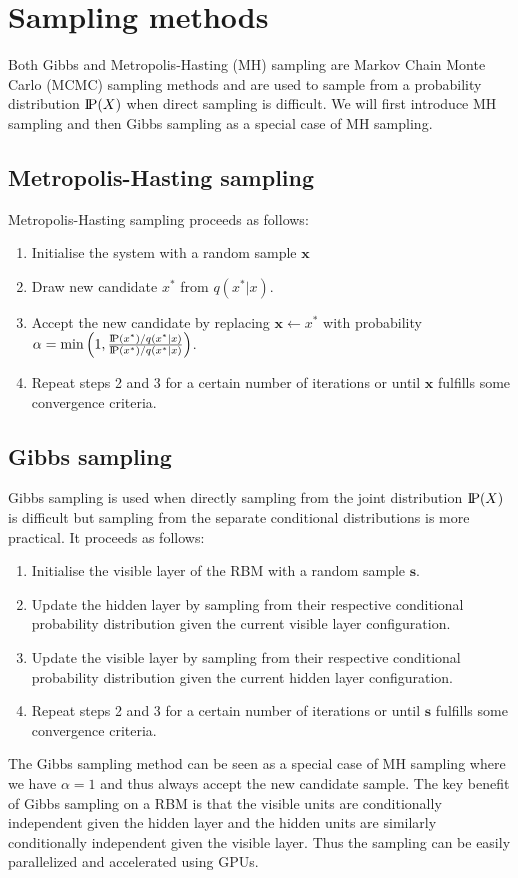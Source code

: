 \section{Sampling methods}\label{samplingmethods}
Both Gibbs and Metropolis-Hasting (MH) sampling are Markov Chain Monte Carlo (MCMC) sampling methods and are used to sample from a probability distribution $\text{I\kern-0.15em P}(X)$ when direct sampling is difficult. We will first introduce MH sampling and then Gibbs sampling as a special case of MH sampling.

\subsection*{Metropolis-Hasting sampling}
Metropolis-Hasting sampling \cite{metropolissampling} proceeds as follows:
\begin{enumerate}
    \item Initialise the system with a random sample $\mathbf{x}$
    \item Draw new candidate $x^*$ from $q(x^*|x)$.
    \item Accept the new candidate by replacing $\mathbf{x} \leftarrow x^*$ with probability $\alpha = \min \left(1, \frac{\text{I\kern-0.15em P}(x^*)/q(x^*|x)}{\text{I\kern-0.15em P}(x^*)/q(x^*|x)}\right)$.
    \item Repeat steps 2 and 3 for a certain number of iterations or until $\mathbf{x}$ fulfills some convergence criteria.
\end{enumerate}

\subsection*{Gibbs sampling}
Gibbs sampling \cite{gibbssampling} is used when directly sampling from the joint distribution $\text{I\kern-0.15em P}(X)$ is difficult but sampling from the separate conditional distributions is more practical. It proceeds as follows:

\begin{enumerate}
    \item Initialise the visible layer of the RBM with a random sample $\mathbf{s}$.
    \item Update the hidden layer by sampling from their respective conditional probability distribution given the current visible layer configuration.
    \item Update the visible layer by sampling from their respective conditional probability distribution given the current hidden layer configuration.
    \item Repeat steps 2 and 3 for a certain number of iterations or until $\mathbf{s}$ fulfills some convergence criteria.
\end{enumerate}

The Gibbs sampling method can be seen as a special case of MH sampling where we have $\alpha = 1$ and thus always accept the new candidate sample. The key benefit of Gibbs sampling on a RBM is that the visible units are conditionally independent given the hidden layer and the hidden units are similarly conditionally independent given the visible layer. Thus the sampling can be easily parallelized and accelerated using GPUs.